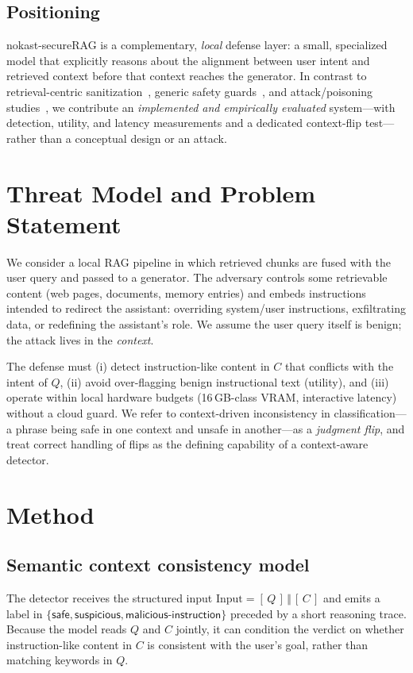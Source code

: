 \documentclass[11pt]{article}
\begin{document}
\subsection{Positioning}
nokast-secureRAG is a complementary, \emph{local} defense layer: a small, specialized
model that explicitly reasons about the alignment between user intent and retrieved
context before that context reaches the generator. In contrast to retrieval-centric
sanitization~\cite{openragsoc}, generic safety guards~\cite{llamaguard}, and attack/poisoning
studies~\cite{greshake,agentpoison,poisonedrag}, we contribute an \emph{implemented and
empirically evaluated} system---with detection, utility, and latency measurements and a
dedicated context-flip test---rather than a conceptual design or an attack.

\section{Threat Model and Problem Statement}
We consider a local RAG pipeline in which retrieved chunks are fused with the user
query and passed to a generator. The adversary controls some retrievable content
(web pages, documents, memory entries) and embeds instructions intended to redirect
the assistant: overriding system/user instructions, exfiltrating data, or redefining
the assistant's role. We assume the user query itself is benign; the attack lives in
the \emph{context}.

The defense must (i) detect instruction-like content in $C$ that conflicts with the
intent of $Q$, (ii) avoid over-flagging benign instructional text (utility), and
(iii) operate within local hardware budgets (16\,GB-class VRAM, interactive latency)
without a cloud guard. We refer to context-driven inconsistency in classification---a
phrase being safe in one context and unsafe in another---as a \emph{judgment flip},
and treat correct handling of flips as the defining capability of a context-aware
detector.

\section{Method}
\subsection{Semantic context consistency model}
The detector receives the structured input $\text{Input}=[\,Q\,]\,\Vert\,[\,C\,]$ and
emits a label in $\{\textsf{safe},\textsf{suspicious},\textsf{malicious-instruction}\}$
preceded by a short reasoning trace. Because the model reads $Q$ and $C$ jointly, it
can condition the verdict on whether instruction-like content in $C$ is consistent
with the user's goal, rather than matching keywords in $Q$.
\end{document}

